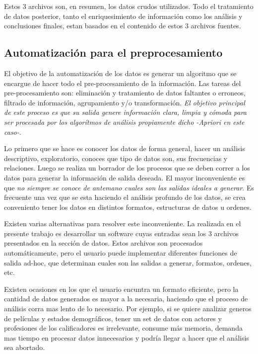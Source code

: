 \documentclass[journal]{IEEEtran}
\begin{document}
Estos 3 archivos son, en resumen, los datos crudos utilizados. 
Todo el tratamiento de datos posterior, tanto el enriquesimiento de información como los
análisis y conclusiones finales, estan basados en el contenido de estos 3 archivos
fuentes.

\subsection{Automatización para el preprocesamiento}
El objetivo de la automatización de los datos es generar un algoritmo que se encargue
de hacer todo el pre-procesamiento de la información. Las tareas del pre-procesamiento
son: eliminación  y tratamiento  de datos faltantes o erroneos, filtrado de información,
agrupamiento y/o transformación.
\emph{El objetivo principal de este proceso es que su salida genere información clara, limpia y cómoda
para ser procesada por los algorítmos de análisis propiamente dicho -Apriori en este caso-.}

Lo primero que se hace es conocer los datos de forma general, hacer un análisis descriptivo,
exploratorio, conoces que tipo de datos son, sus frecuencias y relaciones. Luego se realiza un
borrador de los procesos que se deben correr a los datos para generar la información de salida 
deseada. El mayor inconveniente es que \emph{no siempre se conoce de antemano cuales son las
salidas ideales a generar}. Es frecuente una vez que se esta haciendo el análisis profundo
de los datos, se crea conveniento tener los datos en distintos formatos, estructuras de
datos u ordenes.

Existen varias alternativas para resolver este inconveniente. La realizada en el presente
trabajo es desarrollar un software cuyas entradas sean los 3 archivos presentados en 
la sección de datos. Estos archivos son procesados automáticamente, pero el usuario
puede implementar diferentes funciones de salida ad-hoc, que determinan cuales son
las salidas a generar, formatos, ordenes, etc.

Existen ocasiones en los que el usuario encuntra un formato eficiente, pero la cantidad
de datos generados es mayor a la necesaria, haciendo que el proceso de análisis corra
mas lento de lo necesario. Por ejemplo, si se quiere analizar generos de películas y
estados demográficos, tener un set de datos con actores y profesiones de los calificadores
es irrelevante, consume más memoria, demanda mas tiempo en procesar datos innecesarios
y podría llegar a hacer que el análisis sea abortado.
\end{document}
